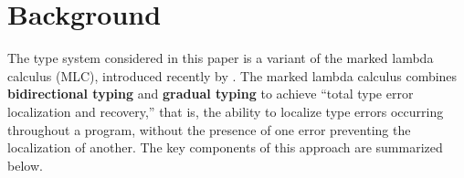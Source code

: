 \documentclass[acmsmall,dvipsnames,10pt,nonacm]{acmart}\settopmatter{printfolios=true} %
\begin{document}

\section{Background}
\label{sec:Background}

The type system considered in this paper is a variant of the marked lambda calculus (MLC), introduced recently by \citet{DBLP:journals/pacmpl/ZhaoMDBPO24}. The marked lambda calculus combines \textbf{bidirectional typing} and \textbf{gradual typing} to achieve ``total type error localization and recovery,'' that is, the ability to localize type errors occurring throughout a program, without the presence of one error preventing the localization of another. The key components of this approach are summarized below. 
\end{document}

